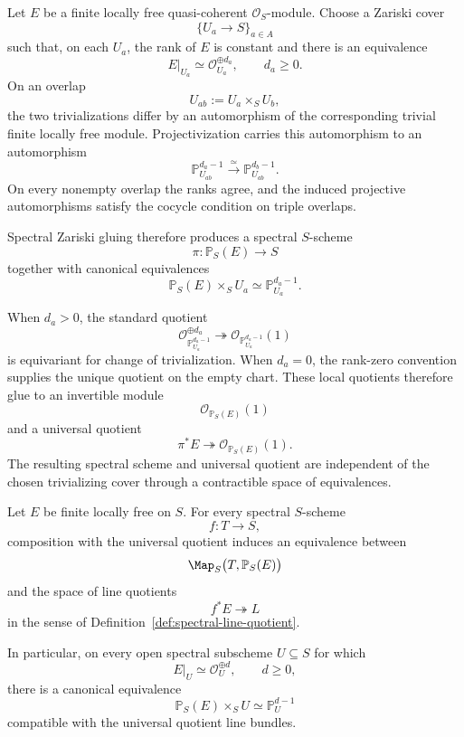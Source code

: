 \begin{construction}
\label{def:spectral-projective-bundle}
Let \(E\) be a finite locally free quasi-coherent
\(\mathcal O_S\)-module.  Choose a Zariski cover
\[
    \{U_a\longrightarrow S\}_{a\in A}
\]
such that, on each \(U_a\), the rank of \(E\) is constant and there is an
equivalence
\[
    E|_{U_a}
    \simeq
    \mathcal O_{U_a}^{\oplus d_a},
    \qquad
    d_a\geq0.
\]
On an overlap
\[
    U_{ab}:=U_a\times_SU_b,
\]
the two trivializations differ by an automorphism of the corresponding
trivial finite locally free module.  Projectivization carries this
automorphism to an automorphism
\[
    \mathbb P^{d_a-1}_{U_{ab}}
    \xrightarrow{\simeq}
    \mathbb P^{d_b-1}_{U_{ab}}.
\]
On every nonempty overlap the ranks agree, and the induced projective
automorphisms satisfy the cocycle condition on triple overlaps.

Spectral Zariski gluing therefore produces a spectral \(S\)-scheme
\[
    \pi:
    \mathbb P_S(E)
    \longrightarrow
    S
\]
together with canonical equivalences
\[
    \mathbb P_S(E)\times_SU_a
    \simeq
    \mathbb P^{d_a-1}_{U_a}.
\]

When \(d_a>0\), the standard quotient
\[
    \mathcal O_{\mathbb P^{d_a-1}_{U_a}}^{\oplus d_a}
    \twoheadrightarrow
    \mathcal O_{\mathbb P^{d_a-1}_{U_a}}(1)
\]
is equivariant for change of trivialization.  When \(d_a=0\), the
rank-zero convention supplies the unique quotient on the empty chart.
These local quotients therefore glue to an invertible module
\[
    \mathcal O_{\mathbb P_S(E)}(1)
\]
and a universal quotient
\[
    \pi^*E
    \twoheadrightarrow
    \mathcal O_{\mathbb P_S(E)}(1).
\]
The resulting spectral scheme and universal quotient are independent of the
chosen trivializing cover through a contractible space of equivalences.
\end{construction}

\begin{proposition}
\label{prop:projective-bundle-local}
Let \(E\) be finite locally free on \(S\).  For every spectral
\(S\)-scheme
\[
    f:T\longrightarrow S,
\]
composition with the universal quotient induces an equivalence between
\[
    \Map_S
    \bigl(
      T,
      \mathbb P_S(E)
    \bigr)
\]
and the space of line quotients
\[
    f^*E
    \twoheadrightarrow
    L
\]
in the sense of
Definition~\ref{def:spectral-line-quotient}.

In particular, on every open spectral subscheme \(U\subseteq S\) for which
\[
    E|_U
    \simeq
    \mathcal O_U^{\oplus d},
    \qquad
    d\geq0,
\]
there is a canonical equivalence
\[
    \mathbb P_S(E)\times_SU
    \simeq
    \mathbb P^{d-1}_U
\]
compatible with the universal quotient line bundles.
\end{proposition}

